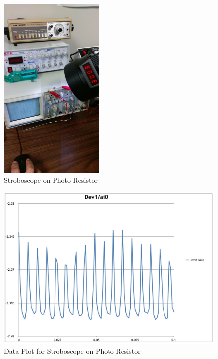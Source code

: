 \documentclass[12pt]{article}
\begin{document}
\begin{figure}[h!] %
   \centering
   \includegraphics[width=2in]{strobe_light_photoresistor.jpg} 
   \caption{Stroboscope on Photo-Resistor}
   \label{fig:example}
\end{figure}

\newpage

\begin{figure}[h!] %
   \centering
   \includegraphics[width=5in]{data2_plot.jpg} 
   \caption{Data Plot for Stroboscope on Photo-Resistor}
   \label{fig:example}
\end{figure}

\bigskip
\end{document}
